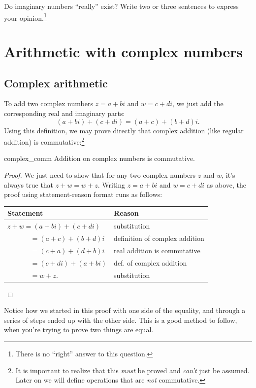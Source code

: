 \begin{exercise}{7} Do imaginary numbers ``really'' exist? Write
two or three sentences to express your opinion.\footnote{There is no ``right'' answer to this question.}
\end{exercise}


\section{Arithmetic with complex numbers\quad 
{}}\label{complex_arith}
\subsection{Complex arithmetic}

To add two complex numbers $z=a+bi$ and $w=c+di$, we just add the
corresponding real and imaginary parts: 
\[(a+bi)+(c+di)=(a+c)+(b+d)i.\]
Using this definition, we may prove directly that complex addition (like regular addition) is commutative:\footnote{It is important to realize that this \emph{must} be proved and \emph{can't} just be assumed.  Later on we will define operations that are \emph{not} commutative.}

\begin{prop}{complex_comm}
Addition on complex numbers is commutative.
\end{prop}
\begin{proof}
We just need to show that for any two complex numbers $z$ and $w$, it's always true that $z + w = w + z$.  Writing $z = a + bi$ and $w = c + di$ as above, the proof using statement-reason format runs as follows:

\begin{tabular}{l| l}
Statement& Reason\\
\hline
$z + w = (a + bi) + (c + di)$ &substitution\\
~~~~~~ $= (a + c) + (b + d)i$ & definition of complex addition\\
~~~~~~ $= (c + a) + (d + b)i$ & real addition is commutative\\
~~~~~~ $= (c + di) + (a + bi)$ & def. of complex addition\\
~~~~~~ $= w + z$. & substitution\\
\end{tabular}

\end{proof}

Notice how we started in this proof with one side of the equality, and through a series of steps ended up with the other side. This is a good method to follow, when you're trying to prove two things are equal.

